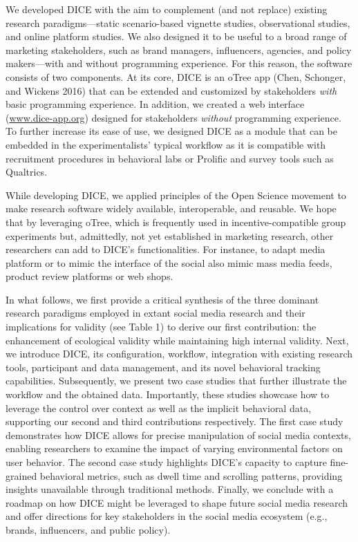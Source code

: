 \documentclass[
  a4paper,
]{scrreprt}
\begin{document}
We developed DICE with the aim to complement (and not replace) existing
research paradigms---static scenario-based vignette studies,
observational studies, and online platform studies. We also designed it
to be useful to a broad range of marketing stakeholders, such as brand
managers, influencers, agencies, and policy makers---with and without
programming experience. For this reason, the software consists of two
components. At its core, DICE is an oTree app (Chen, Schonger, and
Wickens 2016) that can be extended and customized by stakeholders
\emph{with} basic programming experience. In addition, we created a web
interface (\href{https://www.dice-app.org/}{www.dice-app.org}) designed
for stakeholders \emph{without} programming experience. To further
increase its ease of use, we designed DICE as a module that can be
embedded in the experimentalists' typical workflow as it is compatible
with recruitment procedures in behavioral labs or Prolific and survey
tools such as Qualtrics.

While developing DICE, we applied principles of the Open Science
movement to make research software widely available, interoperable, and
reusable. We hope that by leveraging oTree, which is frequently used in
incentive-compatible group experiments but, admittedly, not yet
established in marketing research, other researchers can add to DICE's
functionalities. For instance, to adapt media platform or to mimic the
interface of the social also mimic mass media feeds, product review
platforms or web shops.

In what follows, we first provide a critical synthesis of the three
dominant research paradigms employed in extant social media research and
their implications for validity (see Table 1) to derive our first
contribution: the enhancement of ecological validity while maintaining
high internal validity. Next, we introduce DICE, its configuration,
workflow, integration with existing research tools, participant and data
management, and its novel behavioral tracking capabilities.
Subsequently, we present two case studies that further illustrate the
workflow and the obtained data. Importantly, these studies showcase how
to leverage the control over context as well as the implicit behavioral
data, supporting our second and third contributions respectively. The
first case study demonstrates how DICE allows for precise manipulation
of social media contexts, enabling researchers to examine the impact of
varying environmental factors on user behavior. The second case study
highlights DICE's capacity to capture fine-grained behavioral metrics,
such as dwell time and scrolling patterns, providing insights
unavailable through traditional methods. Finally, we conclude with a
roadmap on how DICE might be leveraged to shape future social media
research and offer directions for key stakeholders in the social media
ecosystem (e.g., brands, influencers, and public policy).
\end{document}
